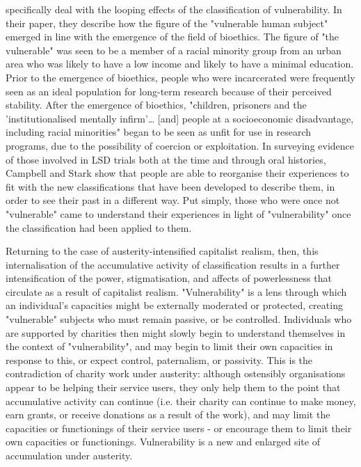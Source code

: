 \citet{campbell_making_2015} specifically deal with the looping effects of the classification of vulnerability. In their paper, they describe how the figure of the "vulnerable human subject" emerged in line with the
emergence of the field of bioethics. The figure of "the vulnerable" was seen to be a member of a racial minority group from an urban area who was likely to have a low income and likely to have a minimal education. Prior to the emergence of bioethics, people who were incarcerated were frequently seen as an ideal population for long-term research because of their perceived stability. After the emergence of bioethics, "children, prisoners and the 'institutionalised mentally infirm'\ldots{} [and] people at a socioeconomic disadvantage, including racial minorities" \citep[16]{campbell_making_2015} began to be seen as unfit for use in research programs, due to the possibility of coercion or exploitation. In surveying evidence of those involved in LSD trials both at the time and through oral histories, Campbell and Stark show that people are able to reorganise their experiences to fit with the new classifications that have been developed to describe them, in order to see their past in a different way. Put simply, those who were once not "vulnerable" came to understand their experiences in light of "vulnerability" once the classification had been applied to them.

Returning to the case of austerity-intensified capitalist realism, then, this internalisation of the accumulative activity of classification results in a further intensification of the power, stigmatisation, and affects of powerlessness that circulate as a result of capitalist realism. "Vulnerability" is a lens through which an individual's capacities might be externally moderated or protected, creating "vulnerable" subjects who must remain passive, or be controlled. Individuals who are supported by charities then might slowly begin to understand themselves in the context of "vulnerability", and may begin to limit their own capacities in response to this, or expect control, paternalism, or passivity. This is the contradiction of charity work under austerity: although ostensibly organisations appear to be helping their service users, they only help them to the point that accumulative activity can continue (i.e. their charity can continue to make money, earn grants, or receive donations as a result of the work), and may limit the capacities or functionings of their service users - or encourage them to limit their own capacities or functionings. Vulnerability is a new and enlarged site of accumulation under austerity.

